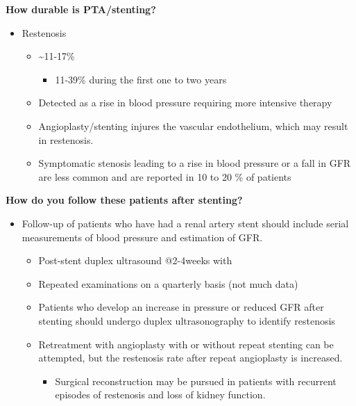 \documentclass[
]{book}
\providecommand{\tightlist}{%
  \setlength{\itemsep}{0pt}\setlength{\parskip}{0pt}}
\begin{document}
\textbf{How durable is PTA/stenting?}

\begin{itemize}
\item
  Restenosis

  \begin{itemize}
  \item
    \textasciitilde11-17\%

    \begin{itemize}
    \tightlist
    \item
      11-39\% during the first one to two years
    \end{itemize}
  \item
    Detected as a rise in blood pressure requiring more intensive
    therapy
  \item
    Angioplasty/stenting injures the vascular endothelium, which may
    result in restenosis.
  \item
    Symptomatic stenosis leading to a rise in blood pressure or a
    fall in GFR are less common and are reported in 10 to 20 \% of
    patients
  \end{itemize}
\end{itemize}

\textbf{How do you follow these patients after stenting?}

\begin{itemize}
\item
  Follow-up of patients who have had a renal artery stent should
  include serial measurements of blood pressure and estimation of GFR.

  \begin{itemize}
  \item
    Post-stent duplex ultrasound @2-4weeks with
  \item
    Repeated examinations on a quarterly basis (not much data)
  \item
    Patients who develop an increase in pressure or reduced GFR
    after stenting should undergo duplex ultrasonography to identify
    restenosis
  \item
    Retreatment with angioplasty with or without repeat stenting can
    be attempted, but the restenosis rate after repeat angioplasty
    is increased.

    \begin{itemize}
    \tightlist
    \item
      Surgical reconstruction may be pursued in patients with
      recurrent episodes of restenosis and loss of kidney
      function.
    \end{itemize}
  \end{itemize}
\end{itemize}
\end{document}
